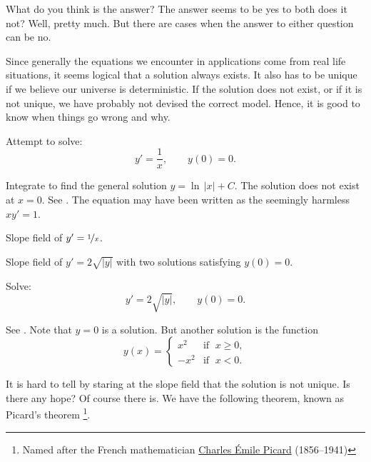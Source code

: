 What do you think is the answer?
The answer seems to be yes to both does it not?  Well, pretty much.  But there
are cases when the answer to either question can be no.

Since generally the equations we encounter in applications
come from real life situations, it seems
logical that a solution always exists.
It also has to be unique if we believe our
universe is deterministic.  If the solution does not exist, or if it is
not unique, we have
probably not devised the correct model.  Hence, it is good to know
when things go wrong and why.

\begin{example}
Attempt to solve:
\begin{equation*}
y' = \frac{1}{x}, \qquad y(0) = 0 .
\end{equation*}

Integrate to find the general solution $y = \ln \, \lvert x \rvert + C$.  The
solution does not exist at $x=0$.  See .
The equation may have been written as the seemingly harmless $x y' = 1$.

\begin{myfig}
\parbox[t]{3in}{
 \capstart
 \caption{Slope field of $y' = \nicefrac{1}{x}$.\label{1.3:xinvfig}}
}
\quad
\parbox[t]{3in}{
 \capstart
 \caption{Slope field of $y' = 2 \sqrt{\lvert y \rvert}$ with two
 solutions satisfying $y(0) = 0$.\label{1.3:sqrtfig}}
}
\end{myfig}
\end{example}

\begin{example}
Solve:
\begin{equation*}
y' = 2 \sqrt{\lvert y \rvert}, \qquad y(0) = 0 .
\end{equation*}

See .
Note that $y=0$ is a solution.  But another solution is the function
\begin{equation*}
y(x) =
\begin{cases}
x^2 & \text{if } \; x \geq 0,\\
-x^2 & \text{if } \; x < 0.
\end{cases}
\end{equation*}
\end{example}

It is hard to tell by staring at the slope field that the
solution is not
unique.
Is there any hope?
Of course there is.  We have the following theorem,
known as Picard's theorem%
\footnote{Named after the French mathematician
\href{https://en.wikipedia.org/wiki/Charles_\%C3\%89mile_Picard}{Charles \'Emile Picard}
(1856--1941)}. 

